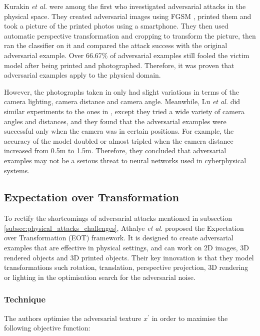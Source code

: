 Kurakin \textit{et al.} \cite{kurakin2016adversarial} were among the first who investigated adversarial attacks in the physical space. They created adversarial images using FGSM \cite{fgsm}, printed them and took a picture of the printed photos using a smartphone. They then used automatic perspective transformation and cropping to transform the picture, then ran the classifier on it and compared the attack success with the original adversarial example. Over 66.67\% of adversarial examples still fooled the victim model after being printed and photographed. Therefore, it was proven that adversarial examples apply to the physical domain.

However, the photographs taken in \cite{kurakin2016adversarial} only had slight variations in terms of the camera lighting, camera distance and camera angle. Meanwhile, Lu \textit{et al.} \cite{lu_physical_experiments} did similar experiments to the ones in \cite{kurakin2016adversarial}, except they tried a wide variety of camera angles and distances, and they found that the adversarial examples were successful only when the camera was in certain positions. For example, the accuracy of the model doubled or almost tripled when the camera distance increased from 0.5m to 1.5m. Therefore, they concluded that adversarial examples may not be a serious threat to neural networks used in cyberphysical systems.

\subsection{Expectation over Transformation}
    \label{subsec:eot}

To rectify the shortcomings of adversarial attacks mentioned in subsection \ref{subsec:physical_attacks_challenges}, Athalye \textit{et al.} \cite{athalye} proposed the Expectation over Transformation (EOT) framework. It is designed to create adversarial examples that are effective in physical settings, and can work on 2D images, 3D rendered objects and 3D printed objects. Their key innovation is that they model transformations such rotation, translation, perspective projection, 3D rendering or lighting in the optimisation search for the adversarial noise. 

\subsubsection{Technique}
    \label{subsubsec:eot_technique}

The authors optimise the adversarial texture $x^\prime$ in order to maximise the following objective function:

